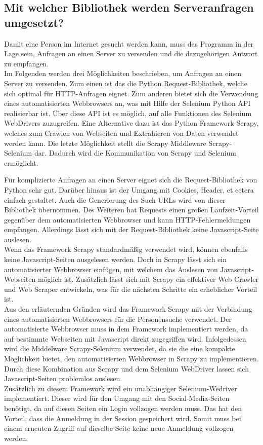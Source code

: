 			
		
		\subsection{Mit welcher Bibliothek werden Serveranfragen umgesetzt?}
		Damit eine Person im Internet gesucht werden kann, muss das Programm in der Lage sein, Anfragen an einen Server zu versenden und die dazugehörigen Antwort zu empfangen. \\
		Im Folgenden werden drei Möglichkeiten beschrieben, um Anfragen an einen Server zu versenden. Zum einen ist das die Python Request-Bibliothek, welche sich optimal für HTTP-Anfragen eignet.\cite{WebScraping} Zum anderen bietet sich die Verwendung eines automatisierten Webbrowsers an, was mit Hilfe der Selenium Python API realisierbar ist.\cite{lawson2015web} Über diese API ist es möglich, auf alle Funktionen des Selenium WebDrivers zuzugreifen.\cite{SeleniumWithPython} Eine Alternative dazu ist das Python Framework Scrapy, welches zum Crawlen von Webseiten und Extrahieren von Daten verwendet werden kann.\cite{Scrapy} Die letzte Möglichkeit stellt die  Scrapy Middleware Scrapy-Selenium dar.\cite{scrapy-selenium} Dadurch wird die Kommunikation von Scrapy und Selenium ermöglicht.
		
		Für komplizierte Anfragen an einen Server eignet sich die Request-Bibliothek von Python sehr gut. Darüber hinaus ist der Umgang mit Cookies, Header, et cetera  einfach gestaltet. Auch die Generierung des Such-URLs wird von dieser Bibliothek übernommen. Des Weiteren hat Requests einen großen Laufzeit-Vorteil gegenüber dem automatisierten Webbrowser und kann HTTP-Fehlermeldungen empfangen. Allerdings lässt sich mit der Request-Bibliothek keine Javascript-Seite auslesen.\\
		Wenn das Framework Scrapy standardmäßig verwendet wird, können ebenfalls keine Javascript-Seiten ausgelesen werden. Doch in Scrapy lässt sich ein automatisierter Webbrowser einfügen, mit welchem das Auslesen von Javascript-Webseiten möglich ist. Zusätzlich lässt sich mit Scrapy ein effektiver Web Crawler und Web Scraper entwickeln, was für die nächsten Schritte ein erheblicher Vorteil ist.\\
		Aus den erläuternden Gründen wird das Framework Scrapy mit der Verbindung eines automatisierten Webbrowsers für die Personensuche verwendet. Der automatisierte Webbrowser muss in dem Framework implementiert werden, da auf bestimmte Webseiten mit Javascript direkt zugegriffen wird. Infolgedessen wird die Middelware Scrapy-Selenium verwendet, da sie die eine kompakte Möglichkeit bietet, den automatisierten Webbrowser in Scrapy zu implementieren. Durch diese Kombination aus Scrapy und dem Selenium WebDriver lassen sich Javascript-Seiten problemlos auslesen. \\
		Zusätzlich zu diesem Framework wird ein unabhängiger Selenium-Wedriver implementiert. Dieser wird für den Umgang mit den Social-Media-Seiten benötigt, da auf diesen Seiten ein Login vollzogen werden muss. Das hat den Vorteil, dass die Anmeldung in der Session gespeichert wird. Somit muss bei einem erneuten Zugriff auf dieselbe Seite keine neue Anmeldung vollzogen werden.
	
